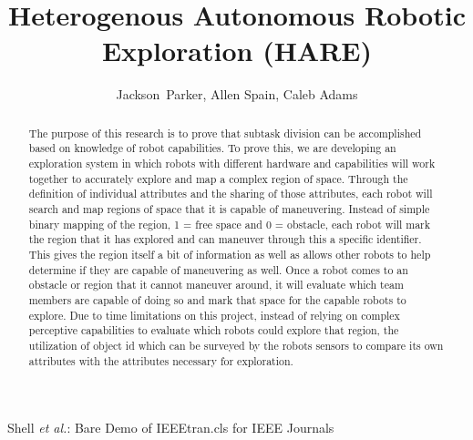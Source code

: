 \documentclass[conference]{IEEEtran}
\begin{document}
\title{Heterogenous Autonomous Robotic Exploration (HARE)}

\author{Jackson~Parker, Allen Spain, Caleb Adams}

%
{Shell \MakeLowercase{\textit{et al.}}: Bare Demo of IEEEtran.cls for IEEE Journals}











\maketitle
\thispagestyle{plain}
\pagestyle{plain}

\begin{abstract}
  The purpose of this research is to prove that subtask division can be accomplished based on knowledge of robot capabilities. To prove this, we are developing an exploration system in which robots with different hardware and capabilities will work together to accurately explore and map a complex region of space. Through the definition of individual attributes and the sharing of those attributes, each robot will search and map regions of space that it is capable of maneuvering. Instead of simple binary mapping of the region, 1 = free space and 0 = obstacle, each robot will mark the region that it has explored and can maneuver through this a specific identifier. This gives the region itself a bit of information as well as allows other robots to help determine if they are capable of maneuvering as well.
  Once a robot comes to an obstacle or region that it cannot maneuver around, it will evaluate which team members are capable of doing so and mark that space for the capable robots to explore. Due to time limitations on this project, instead of relying on complex perceptive capabilities to evaluate which robots could explore that region, the utilization of object id which can be surveyed by the robots sensors to compare its own attributes with the attributes necessary for exploration.
\end{abstract}
\end{document}
